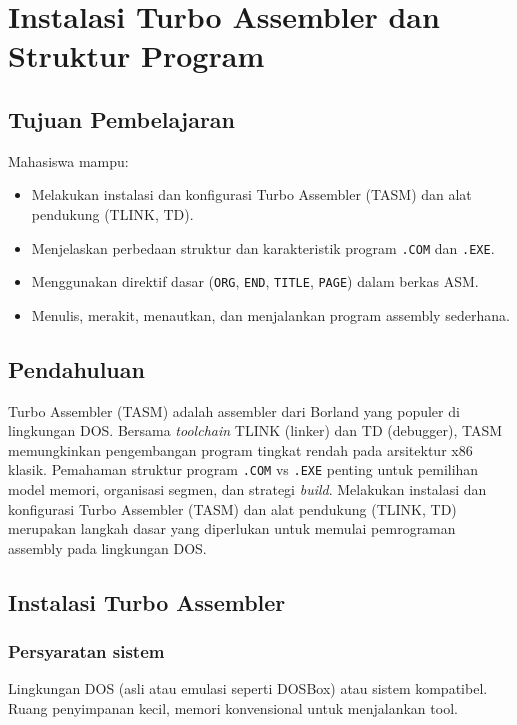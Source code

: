 \documentclass[../main.tex]{subfiles}
\begin{document}
\chapter{Instalasi Turbo Assembler dan Struktur Program}

\section{Tujuan Pembelajaran}
Mahasiswa mampu:
\begin{itemize}
    \item Melakukan instalasi dan konfigurasi Turbo Assembler (TASM) dan alat \\
    pendukung (TLINK, TD).
    \item Menjelaskan perbedaan struktur dan karakteristik program \texttt{.COM} dan \texttt{.EXE}.
    \item Menggunakan direktif dasar (\texttt{ORG}, \texttt{END}, \texttt{TITLE}, \texttt{PAGE}) dalam berkas ASM.
    \item Menulis, merakit, menautkan, dan menjalankan program assembly sederhana.
\end{itemize}

\section{Pendahuluan}
Turbo Assembler (TASM) adalah assembler dari Borland yang populer di lingkungan DOS. Bersama \textit{toolchain} TLINK (linker) dan TD (debugger), TASM memungkinkan pengembangan program tingkat rendah pada arsitektur x86 klasik. Pemahaman struktur program \texttt{.COM} vs \texttt{.EXE} penting untuk pemilihan model memori, organisasi segmen, dan strategi \textit{build}. Melakukan instalasi dan konfigurasi Turbo Assembler (TASM) dan alat pendukung (TLINK, TD) merupakan langkah dasar yang diperlukan untuk memulai pemrograman assembly pada lingkungan DOS.

\section{Instalasi Turbo Assembler}
\subsection{Persyaratan sistem}
Lingkungan DOS (asli atau emulasi seperti DOSBox) atau sistem kompatibel. Ruang penyimpanan kecil, memori konvensional untuk menjalankan tool.
\end{document}
